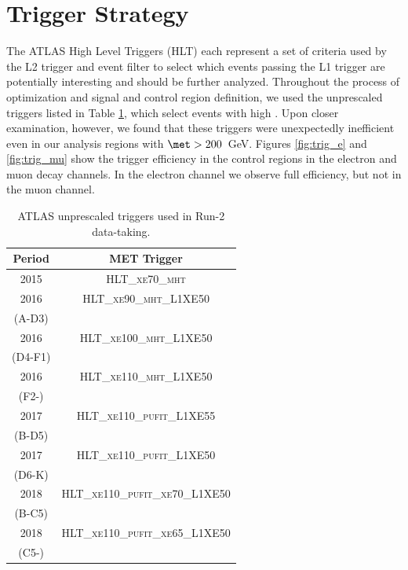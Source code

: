 \section{Trigger Strategy}
\FloatBarrier
The ATLAS High Level Triggers (HLT) each represent a set of criteria used by the L2 trigger and event filter to select which events passing the L1 trigger are potentially interesting and should be further analyzed. Throughout the process of optimization and signal and control region definition, we used the unprescaled \met triggers listed in Table \ref{tab:met_trigs}, which select events with high \met. Upon closer examination, however, we found that these triggers were unexpectedly inefficient even in our analysis regions with $\met > 200$~GeV. Figures \ref{fig:trig_e} and \ref{fig:trig_mu} show the \met trigger efficiency in the \ttbar control regions in the electron and muon decay channels. In the electron channel we observe full efficiency, but not in the muon channel.

\begin{table}
\footnotesize{
	\begin{center}
	\begin{tabular}{ c c}
		\toprule
			Period & MET Trigger \\
			\midrule
			2015 & \textsc{HLT\_xe70\_mht} \\
			\midrule
			2016 & \textsc{HLT\_xe90\_mht\_L1XE50} \\
			(A-D3) \\
			\midrule
			2016 & \textsc{HLT\_xe100\_mht\_L1XE50} \\
			(D4-F1) \\
			\midrule
			2016 & \textsc{HLT\_xe110\_mht\_L1XE50} \\
			(F2-) \\
			\midrule
			2017 & \textsc{HLT\_xe110\_pufit\_L1XE55} \\
			(B-D5) \\
			\midrule
			2017 & \textsc{HLT\_xe110\_pufit\_L1XE50} \\
			(D6-K) \\
			\midrule
			2018 & \textsc{HLT\_xe110\_pufit\_xe70\_L1XE50} \\
			(B-C5) \\
			\midrule
			2018 & \textsc{HLT\_xe110\_pufit\_xe65\_L1XE50} \\
			(C5-) \\
		\bottomrule
	\end{tabular}
	\end{center}
	}
  \caption{ATLAS unprescaled \met triggers used in Run-2 data-taking.}
  \label{tab:met_trigs}
\end{table}

